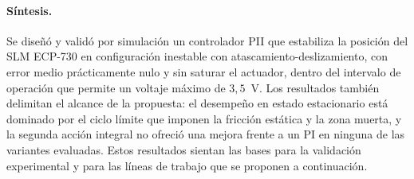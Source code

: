 \paragraph{Síntesis.}
Se diseñó y validó por simulación un controlador PII que estabiliza la posición del SLM ECP-730 en configuración inestable con atascamiento-deslizamiento, con error medio prácticamente nulo y sin saturar el actuador, dentro del intervalo de operación que permite un voltaje máximo de $3{,}5$~V. Los resultados también delimitan el alcance de la propuesta: el desempeño en estado estacionario está dominado por el ciclo límite que imponen la fricción estática y la zona muerta, y la segunda acción integral no ofreció una mejora frente a un PI en ninguna de las variantes evaluadas. Estos resultados sientan las bases para la validación experimental y para las líneas de trabajo que se proponen a continuación.
